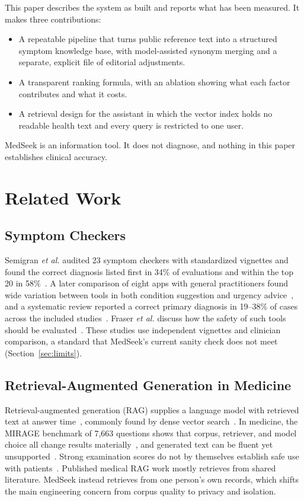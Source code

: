 \documentclass[conference]{IEEEtran}
\begin{document}
This paper describes the system as built and reports what has been measured. It makes three contributions:
\begin{itemize}
\item A repeatable pipeline that turns public reference text into a structured symptom knowledge base, with model-assisted synonym merging and a separate, explicit file of editorial adjustments.
\item A transparent ranking formula, with an ablation showing what each factor contributes and what it costs.
\item A retrieval design for the assistant in which the vector index holds no readable health text and every query is restricted to one user.
\end{itemize}

MedSeek is an information tool. It does not diagnose, and nothing in this paper establishes clinical accuracy.

\section{Related Work}

\subsection{Symptom Checkers}

Semigran \textit{et al.} audited 23 symptom checkers with standardized vignettes and found the correct diagnosis listed first in 34\% of evaluations and within the top 20 in 58\%~\cite{semigran2015}. A later comparison of eight apps with general practitioners found wide variation between tools in both condition suggestion and urgency advice~\cite{gilbert2020}, and a systematic review reported a correct primary diagnosis in 19--38\% of cases across the included studies~\cite{wallace2022}. Fraser \textit{et al.} discuss how the safety of such tools should be evaluated~\cite{fraser2018}. These studies use independent vignettes and clinician comparison, a standard that MedSeek's current sanity check does not meet (Section~\ref{sec:limits}).

\subsection{Retrieval-Augmented Generation in Medicine}

Retrieval-augmented generation (RAG) supplies a language model with retrieved text at answer time~\cite{lewis2020}, commonly found by dense vector search~\cite{karpukhin2020}. In medicine, the MIRAGE benchmark of 7,663 questions shows that corpus, retriever, and model choice all change results materially~\cite{xiong2024}, and generated text can be fluent yet unsupported~\cite{ji2023}. Strong examination scores do not by themselves establish safe use with patients~\cite{singhal2023}. Published medical RAG work mostly retrieves from shared literature. MedSeek instead retrieves from one person's own records, which shifts the main engineering concern from corpus quality to privacy and isolation.
\end{document}
